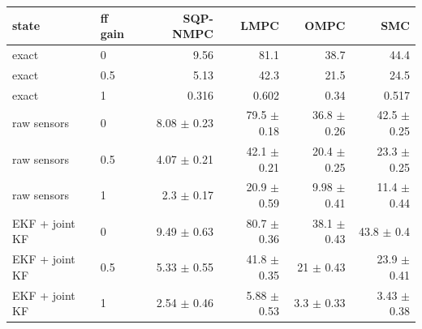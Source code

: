 \begin{tabular}{llrrrr}
\toprule
state & ff gain & SQP-NMPC & LMPC & OMPC & SMC \\
\midrule
exact & 0 & 9.56 & 81.1 & 38.7 & 44.4 \\
exact & 0.5 & 5.13 & 42.3 & 21.5 & 24.5 \\
exact & 1 & 0.316 & 0.602 & 0.34 & 0.517 \\
\addlinespace
raw sensors & 0 & 8.08 $\pm$ 0.23 & 79.5 $\pm$ 0.18 & 36.8 $\pm$ 0.26 & 42.5 $\pm$ 0.25 \\
raw sensors & 0.5 & 4.07 $\pm$ 0.21 & 42.1 $\pm$ 0.21 & 20.4 $\pm$ 0.25 & 23.3 $\pm$ 0.25 \\
raw sensors & 1 & 2.3 $\pm$ 0.17 & 20.9 $\pm$ 0.59 & 9.98 $\pm$ 0.41 & 11.4 $\pm$ 0.44 \\
\addlinespace
EKF + joint KF & 0 & 9.49 $\pm$ 0.63 & 80.7 $\pm$ 0.36 & 38.1 $\pm$ 0.43 & 43.8 $\pm$ 0.4 \\
EKF + joint KF & 0.5 & 5.33 $\pm$ 0.55 & 41.8 $\pm$ 0.35 & 21 $\pm$ 0.43 & 23.9 $\pm$ 0.41 \\
EKF + joint KF & 1 & 2.54 $\pm$ 0.46 & 5.88 $\pm$ 0.53 & 3.3 $\pm$ 0.33 & 3.43 $\pm$ 0.38 \\
\bottomrule
\end{tabular}
